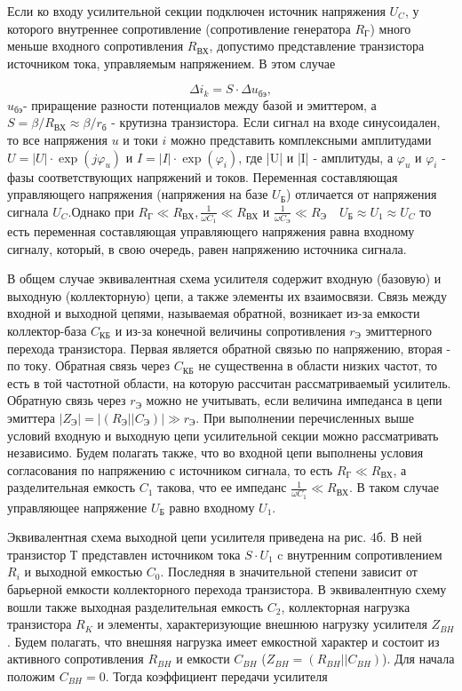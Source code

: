 Если ко входу усилительной секции подключен источник напряжения $U_C$, у которого внутреннее сопротивление (сопротивление генератора $R_{\text{Г}}$) много меньше входного сопротивления $R_{\text{ВХ}}$, допустимо представление транзистора источником тока, управляемым напряжением. В этом случае

$$\Delta i_k = S\cdot \Delta u_{\text{бэ}},$$
$u_{\text{бэ}}$- приращение разности потенциалов между базой и эмиттером, а $S=\beta/R_{\text{ВХ}} \approx \beta/r_{\text{б}}$ - крутизна транзистора. Если сигнал на входе
синусоидален, то все напряжения $u$ и токи $i$ можно представить
комплексными амплитудами $U=|U|\cdot \exp(j\varphi_u)$ и $I=|I|\cdot \exp(\varphi_i)$, где |U| и |I| - амплитуды, а $\varphi_u$ и $\varphi_i$ - фазы соответствующих напряжений и токов. Переменная составляющая управляющего напряжения (напряжения на базе $U_{\text{Б}}$) отличается от напряжения сигнала $U_C$.Однако при $R_{\text{Г}}\ll R_{\text{ВХ}},\frac{1}{\omega C_1}\ll R_{\text{ВХ}}$ и $\frac{1}{\omega C_{\text{Э}}}\ll R_{\text{Э}}$~~$U_{\text{Б}} \approx U_1 \approx U_C$ то есть переменная составляющая управляющего напряжения равна входному сигналу, который, в свою очередь, равен напряжению источника сигнала.

В общем случае эквивалентная схема усилителя содержит входную (базовую) и выходную (коллекторную) цепи, а также элементы их взаимосвязи. Связь между входной и выходной цепями, называемая обратной, возникает из-за емкости коллектор-база $C_{\text{КБ}}$ и из-за конечной величины сопротивления $r_{\text{Э}}$ эмиттерного перехода транзистора. Первая является обратной связью по напряжению, вторая - по току. Обратная связь через $C_{\text{КБ}}$ не существенна в области низких частот, то есть в той частотной области, на которую рассчитан рассматриваемый усилитель. Обратную связь через $r_{\text{Э}}$ можно не учитывать, если величина импеданса в цепи эмиттера $|Z_{\text{Э}}|=| (R_{\text{Э}}||C_{\text{Э}})|\gg r_{\text{Э}}$. При выполнении перечисленных выше условий входную и выходную цепи усилительной секции можно рассматривать независимо. Будем полагать также, что во входной цепи выполнены условия согласования по напряжению с источником сигнала, то есть $R_{\text{Г}} \ll R_{\text{ВХ}}$, а разделительная емкость $C_1$ такова, что ее импеданс $\frac{1}{\omega C_1} \ll R_{\text{ВХ}}$. В таком случае управляющее напряжение $U_{\text{Б}}$ равно входному $U_1$.

Эквивалентная схема выходной цепи усилителя приведена на рис. 4б. В ней транзистор Т представлен источником тока $S\cdot U_1$ c внутренним сопротивлением $R_i$ и выходной емкостью $C_0$. Последняя в значительной степени зависит от барьерной емкости коллекторного перехода транзистора. В эквивалентную схему вошли также выходная разделительная емкость $C_2$, коллекторная нагрузка транзистора $R_K$ и элементы, характеризующие внешнюю нагрузку усилителя $Z_{BH}$. Будем полагать, что внешняя нагрузка имеет емкостной характер и состоит из активного сопротивления $R_{BH}$ и емкости $C_{BH}$ ($Z_{BH}=(R_{BH}||C_{BH})$). Для начала положим $C_{BH}=0$. Тогда коэффициент передачи усилителя

